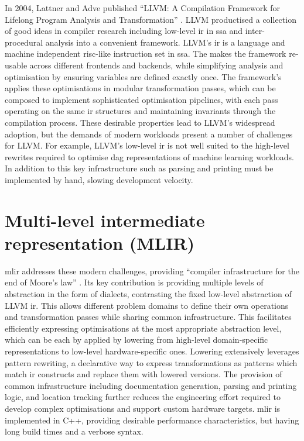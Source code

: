 In 2004, Lattner and Adve published ``LLVM: A Compilation Framework for
Lifelong Program Analysis and Transformation'' \cite{lattnerLLVMCompilationFramework2004}.
LLVM productised a collection of good ideas in compiler research including low-level \ac{ir} in \ac{ssa} and inter-procedural analysis into a convenient framework.
LLVM's \ac{ir} is a language and machine independent \ac{risc}-like instruction set in \acf{ssa}. The makes the framework re-usable across different frontends and backends, while simplifying analysis and optimisation by ensuring variables are defined exactly once. The framework's applies these optimisations in modular transformation passes, which can be composed to implement sophisticated optimisation pipelines, with each pass operating on the same \ac{ir} structures and maintaining invariants through the compilation process.
These desirable properties lead to LLVM's widespread adoption, %
but the demands of modern workloads present a number of challenges for LLVM.
For example, LLVM's low-level \ac{ir} is not well suited to the high-level rewrites required to optimise \ac{dag} representations of machine learning workloads. In addition to this key infrastructure such as parsing and printing must be implemented by hand, slowing development velocity.

\section{Multi-level intermediate representation (MLIR)}
\label{sec:mlir}

\acf{mlir} addresses these modern challenges, providing ``compiler infrastructure for the end of Moore's law'' \cite{lattnerMLIRScalingCompiler2021a}.
Its key contribution is providing multiple levels of abstraction in the form of dialects, contrasting the fixed low-level abstraction of LLVM \ac{ir}. This allows different problem domains to define their own operations and transformation passes while sharing common infrastructure. This facilitates efficiently expressing optimisations at the most appropriate abstraction level, which can be each by applied by lowering from high-level domain-specific representations to low-level hardware-specific ones. Lowering extensively leverages pattern rewriting, a declarative way to express transformations as patterns which match \ac{ir} constructs and replace them with lowered versions.
The provision of common infrastructure including documentation generation, parsing and printing logic, and location tracking further reduces the engineering effort required to develop complex optimisations and support custom hardware targets.
\ac{mlir} is implemented in C++, providing desirable performance characteristics, but having long build times and a verbose syntax.


